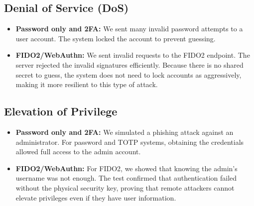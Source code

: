 \subsection{Denial of Service (DoS)}
\begin{itemize}
    \item \textbf{Password only and 2FA:} We sent many invalid password attempts to a user account. The system locked the account to prevent guessing.
    \item \textbf{FIDO2/WebAuthn:} We sent invalid requests to the FIDO2 endpoint. The server rejected the invalid signatures efficiently. Because there is no shared secret to guess, the system does not need to lock accounts as aggressively, making it more resilient to this type of attack.
\end{itemize}

\subsection{Elevation of Privilege}
\begin{itemize}
    \item \textbf{Password only and 2FA:} We simulated a phishing attack against an administrator. For password and TOTP systems, obtaining the credentials allowed full access to the admin account.
    \item \textbf{FIDO2/WebAuthn:} For FIDO2, we showed that knowing the admin's username was not enough. The test confirmed that authentication failed without the physical security key, proving that remote attackers cannot elevate privileges even if they have user information.
\end{itemize}
